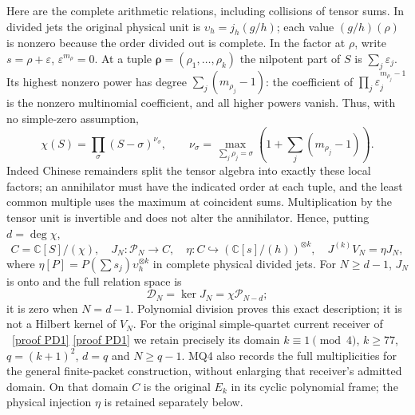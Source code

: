 \documentclass[11pt]{article}
\newcommand{\C}{\mathbb C}
\newcommand{\DD}{\mathcal D}
\begin{document}
Here are the complete arithmetic relations, including collisions of
tensor sums. In divided jets the original physical unit is
$\upsilon_h=j_h(g/h)$; each value $(g/h)(\rho)$ is nonzero because
the order divided out is complete. In the factor at $\rho$, write
$s=\rho+\varepsilon$, $\varepsilon^{m_\rho}=0$. At a tuple
$\boldsymbol\rho=(\rho_1,\ldots,\rho_k)$ the nilpotent part of
$S$ is $\sum_j\varepsilon_j$. Its highest nonzero power has degree
$\sum_j(m_{\rho_j}-1)$: the coefficient of
$\prod_j\varepsilon_j^{m_{\rho_j}-1}$ is the nonzero multinomial
coefficient, and all higher powers vanish. Thus, with no simple-zero
assumption,
\[
 \chi(S)=\prod_\sigma(S-\sigma)^{\nu_\sigma},\qquad
 \nu_\sigma=\max_{\sum_j\rho_j=\sigma}
       \left(1+\sum_j(m_{\rho_j}-1)\right).                    \tag{MQ4}
\]
Indeed Chinese remainders split the tensor algebra into exactly
these local factors; an annihilator must have the indicated order
at each tuple, and the least common multiple uses the maximum at
coincident sums. Multiplication by the tensor unit is invertible and
does not alter the annihilator. Hence, putting $d=\deg\chi$,
\[
 C=\C[S]/(\chi),\quad J_N:\mathcal P_N\longrightarrow C,
 \quad \eta:C\hookrightarrow(\C[s]/(h))^{\otimes k},\quad
 J^{(k)}V_N=\eta J_N,                                       \tag{MQ5}
\]
where $\eta[P]=P(\sum s_j)\upsilon_h^{\otimes k}$ in complete
physical divided jets. For $N\ge d-1$, $J_N$ is onto and the full
relation space is
\[
 \DD_N=\ker J_N=\chi\mathcal P_{N-d};                         \tag{MQ6}
\]
it is zero when $N=d-1$. Polynomial division proves this exact
description; it is not a Hilbert kernel of $V_N$.
For the original simple-quartet current receiver of \cite{PD}%
~\href{https://github.com/KokunoYumeto/zeta-function-research-reader/blob/5992ad50c0f2a06921f1fcaded7b4e38097c0739/workbenches/splitzero-tandem/continuations/20260920-original-kernel-mixed-determinants/providers/PROJECTION_PHASE_DERIVATION.tex\#L22}{[proof PD1]} \href{https://github.com/KokunoYumeto/zeta-function-research-reader/blob/5992ad50c0f2a06921f1fcaded7b4e38097c0739/workbenches/splitzero-tandem/continuations/20260920-original-kernel-mixed-determinants/providers/PROJECTION_PHASE_RETURN.tex\#L25}{[proof PD1]}%
{} we
retain precisely its domain $k\equiv1\pmod4$, $k\ge77$,
$q=(k+1)^2$, $d=q$ and $N\ge q-1$. MQ4 also records the full
multiplicities for the general finite-packet construction, without
enlarging that receiver's admitted domain.
On that domain $C$ is the original $E_k$ in its cyclic polynomial
frame; the physical injection $\eta$ is retained separately below.
\end{document}
